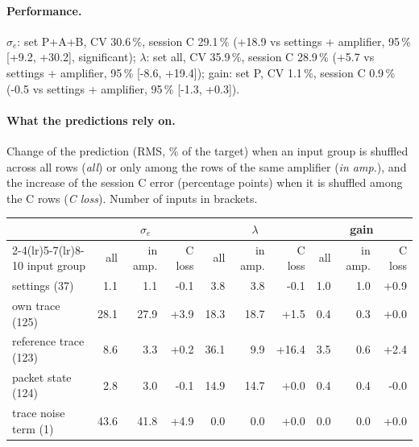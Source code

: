 \paragraph{Performance.}
$\sigma_e$: set P+A+B, CV 30.6\,\%, session C 29.1\,\% (+18.9 vs settings + amplifier, 95\,\% [+9.2, +30.2], significant); $\lambda$: set all, CV 35.9\,\%, session C 28.9\,\% (+5.7 vs settings + amplifier, 95\,\% [-8.6, +19.4]); gain: set P, CV 1.1\,\%, session C 0.9\,\% (-0.5 vs settings + amplifier, 95\,\% [-1.3, +0.3]).
\paragraph{What the predictions rely on.} Change of the prediction (RMS, \% of the target) when an input group is shuffled across all rows (\emph{all}) or only among the rows of the same amplifier (\emph{in amp.}), and the increase of the session C error (percentage points) when it is shuffled among the C rows (\emph{C loss}). Number of inputs in brackets.
\begin{center}\footnotesize
\begin{tabular}{lrrrrrrrrr}
\toprule
 & \multicolumn{3}{c}{$\sigma_e$} & \multicolumn{3}{c}{$\lambda$} & \multicolumn{3}{c}{gain} \\
\cmidrule(lr){2-4}\cmidrule(lr){5-7}\cmidrule(lr){8-10}
input group & all & in amp. & C loss & all & in amp. & C loss & all & in amp. & C loss \\
\midrule
settings (37) & 1.1 & 1.1 & -0.1 & 3.8 & 3.8 & -0.1 & 1.0 & 1.0 & +0.9 \\
own trace (125) & 28.1 & 27.9 & +3.9 & 18.3 & 18.7 & +1.5 & 0.4 & 0.3 & +0.0 \\
reference trace (123) & 8.6 & 3.3 & +0.2 & 36.1 & 9.9 & +16.4 & 3.5 & 0.6 & +2.4 \\
packet state (124) & 2.8 & 3.0 & -0.1 & 14.9 & 14.7 & +0.0 & 0.4 & 0.4 & -0.0 \\
trace noise term (1) & 43.6 & 41.8 & +4.9 & 0.0 & 0.0 & +0.0 & 0.0 & 0.0 & +0.0 \\
\bottomrule
\end{tabular}
\end{center}

